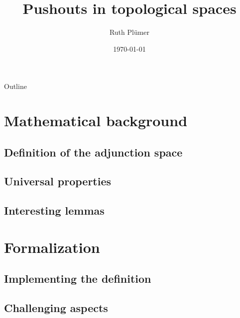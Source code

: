 \documentclass{beamer}
\title{Pushouts in topological spaces}
\author{Ruth Plümer}
\institute{Practical training course: Formalizing mathematics in Lean}
\date{\today}
\begin{document}
	\begin{frame}
		\titlepage 
	\end{frame}
	\begin{frame}{Outline}
		\tableofcontents
	\end{frame}
	\section{Mathematical background}
	\subsection{Definition of the adjunction space}
	\subsection{Universal properties}
	\subsection{Interesting lemmas}
	\section{Formalization}
	\subsection{Implementing the definition}
	\subsection{Challenging aspects}
\end{document}
